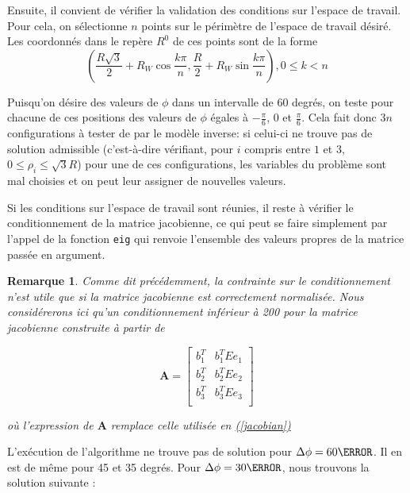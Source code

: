 \documentclass{article}
\newtheorem*{remark}{Remarque}
\begin{document}
\begin{multicols*}{2}
Ensuite, il convient de vérifier la validation des conditions sur l'espace de travail. Pour cela, on sélectionne $n$ points sur le périmètre de l'espace de travail désiré. Les coordonnés dans le repère $R^0$ de ces points sont de la forme
\begin{equation*}
    \left(\frac{R \sqrt{3}}{2}+R_W \cos{\frac{k \pi}{n}}, \frac{R}{2}+R_W \sin{\frac{k \pi}{n}} \right), 0\leq k<n
\end{equation*}

Puisqu'on désire des valeurs de $\phi$ dans un intervalle de 60 degrés, on teste pour chacune de ces positions des valeurs de $\phi$ égales à $-\frac{\pi}{6}$, $0$ et $\frac{\pi}{6}$. Cela fait donc $3n$ configurations à tester de par le modèle inverse: si celui-ci ne trouve pas de solution admissible (c'est-à-dire vérifiant, pour $i$ compris entre $1$ et $3$, $0 \leq \rho_i \leq \sqrt{3}R$) pour une de ces configurations, les variables du problème sont mal choisies et on peut leur assigner de nouvelles valeurs.

Si les conditions sur l'espace de travail sont réunies, il reste à vérifier le conditionnement de la matrice jacobienne, ce qui peut se faire simplement par l'appel de la fonction \texttt{eig} qui renvoie l'ensemble des valeurs propres de la matrice passée en argument.

\begin{remark}
Comme dit précédemment, la contrainte sur le conditionnement n'est utile que si la matrice jacobienne est correctement normalisée. Nous considérerons ici qu'un conditionnement inférieur à 200 pour la matrice jacobienne construite à partir de 

\begin{equation*}
    \mathbf{A} = \begin{bmatrix}
    b_1^T & b_1^TEe_1\\
    b_2^T & b_2^TEe_2\\
    b_3^T & b_3^TEe_3\\
    \end{bmatrix}
\end{equation*}

où l'expression de $\mathbf{A}$ remplace celle utilisée en \hyperref[jacobian]{(\ref{jacobian})}
\end{remark}

L'exécution de l'algorithme ne trouve pas de solution pour $\Delta \phi = 60\degree$. Il en est de même pour 45 et 35 degrés. Pour  $\Delta \phi = 30\degree$, nous trouvons la solution  suivante : 
\bigskip


\end{multicols*}
\end{document}
